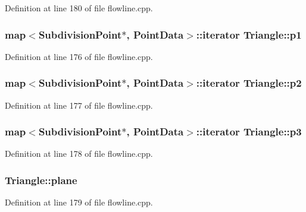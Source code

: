 Definition at line 180 of file flowline.\+cpp.

\subsubsection[{\texorpdfstring{p1}{p1}}]{\setlength{\rightskip}{0pt plus 5cm}map$<${\bf Subdivision\+Point}$\ast$, {\bf Point\+Data}$>$\+::iterator Triangle\+::p1}\hypertarget{structTriangle_a0bd45e80838b35f6039141b54825021c}{}\label{structTriangle_a0bd45e80838b35f6039141b54825021c}


Definition at line 176 of file flowline.\+cpp.

\subsubsection[{\texorpdfstring{p2}{p2}}]{\setlength{\rightskip}{0pt plus 5cm}map$<${\bf Subdivision\+Point}$\ast$, {\bf Point\+Data}$>$\+::iterator Triangle\+::p2}\hypertarget{structTriangle_a262c0985278b81e4a35e45abc6634c77}{}\label{structTriangle_a262c0985278b81e4a35e45abc6634c77}


Definition at line 177 of file flowline.\+cpp.

\subsubsection[{\texorpdfstring{p3}{p3}}]{\setlength{\rightskip}{0pt plus 5cm}map$<${\bf Subdivision\+Point}$\ast$, {\bf Point\+Data}$>$\+::iterator Triangle\+::p3}\hypertarget{structTriangle_a05641ea7149f1b30a2f9532f15f77ea2}{}\label{structTriangle_a05641ea7149f1b30a2f9532f15f77ea2}


Definition at line 178 of file flowline.\+cpp.

\subsubsection[{\texorpdfstring{plane}{plane}}]{ Triangle\+::plane}\hypertarget{structTriangle_ada7eceff17634fee881e0f679941aaaa}{}\label{structTriangle_ada7eceff17634fee881e0f679941aaaa}


Definition at line 179 of file flowline.\+cpp.

